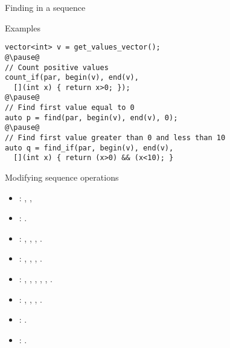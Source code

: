 \begin{frame}[t,fragile]{Finding in a sequence}
\begin{block}{Examples}
\begin{lstlisting}[escapechar=@]
vector<int> v = get_values_vector();
@\pause@
// Count positive values
count_if(par, begin(v), end(v), 
  [](int x) { return x>0; });
@\pause@
// Find first value equal to 0
auto p = find(par, begin(v), end(v), 0);
@\pause@
// Find first value greater than 0 and less than 10
auto q = find_if(par, begin(v), end(v),
  [](int x) { return (x>0) && (x<10); }
\end{lstlisting}
\end{block}
\end{frame}

\begin{frame}[t]{Modifying sequence operations}
\begin{itemize}
  \item {}:
    ,
    ,
  \item {}:
    .
  \item {}:
    ,
    ,
    ,
    .
  \item {}:
    ,
    ,
    ,
    .
  \item {}:
    ,
    ,
    ,
    ,
    ,
    .
  \item {}:
    ,
    ,
    ,
    .
  \item {}: .
  \item {}: .
\end{itemize}
\end{frame}

